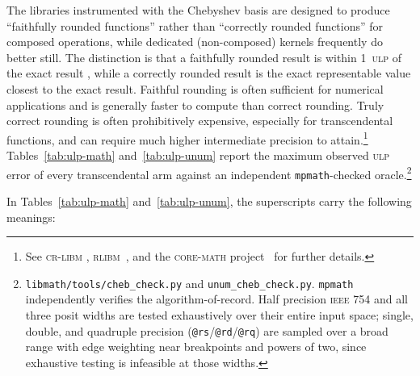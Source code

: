 \documentclass[twoside]{article}
\begin{document}
\sloppy
The libraries instrumented with the Chebyshev basis are designed to produce ``faithfully rounded functions'' rather than ``correctly rounded functions'' for composed operations, while dedicated (non-composed) kernels frequently do better still.  The distinction is that a faithfully rounded result is within 1~\textsc{ulp} of the exact result \citep{Rump2008}, while a correctly rounded result is the exact representable value closest to the exact result.  Faithful rounding is often sufficient for numerical applications and is generally faster to compute than correct rounding.  Truly correct rounding is often prohibitively expensive, especially for transcendental functions, and can require much higher intermediate precision to attain.\footnote{See \textsc{cr-libm} \citep{daramy2003crlibm}, \textsc{rlibm}~\citep{lim2021rlibm}, and the \textsc{core-math} project~\citep{coremath} for further details.}  Tables~\ref{tab:ulp-math} and~\ref{tab:ulp-unum} report the maximum observed \textsc{ulp} error of every transcendental arm against an independent \texttt{mpmath}-checked oracle.\footnote{\texttt{libmath/tools/cheb\_check.py} and \texttt{unum\_cheb\_check.py}.  \texttt{mpmath} independently verifies the algorithm-of-record.  Half precision \textsc{ieee} 754 and all three posit widths are tested exhaustively over their entire input space; single, double, and quadruple precision (\texttt{@rs}/\texttt{@rd}/\texttt{@rq}) are sampled over a broad range with edge weighting near breakpoints and powers of two, since exhaustive testing is infeasible at those widths.}

In Tables~\ref{tab:ulp-math} and~\ref{tab:ulp-unum}, the superscripts carry the following meanings:
\end{document}
